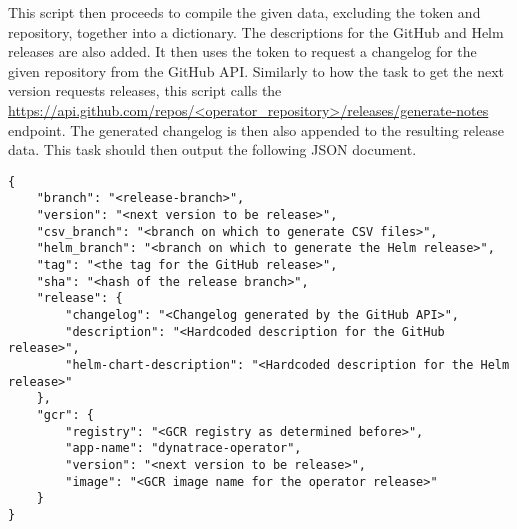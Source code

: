 This script then proceeds to compile the given data, excluding the token and repository, together into a dictionary.
The descriptions for the GitHub and Helm releases are also added.
It then uses the token to request a changelog for the given repository from the GitHub API.
Similarly to how the task to get the next version requests releases, this script calls the \url{https://api.github.com/repos/<operator_repository>/releases/generate-notes} endpoint.
The generated changelog is then also appended to the resulting release data.
This task should then output the following JSON document.

\begin{verbatim}
{
    "branch": "<release-branch>",
    "version": "<next version to be release>",
    "csv_branch": "<branch on which to generate CSV files>",
    "helm_branch": "<branch on which to generate the Helm release>",
    "tag": "<the tag for the GitHub release>",
    "sha": "<hash of the release branch>",
    "release": {
        "changelog": "<Changelog generated by the GitHub API>",
        "description": "<Hardcoded description for the GitHub release>",
        "helm-chart-description": "<Hardcoded description for the Helm release>"
    },
    "gcr": {
        "registry": "<GCR registry as determined before>",
        "app-name": "dynatrace-operator",
        "version": "<next version to be release>",
        "image": "<GCR image name for the operator release>"
    }
}
\end{verbatim}
